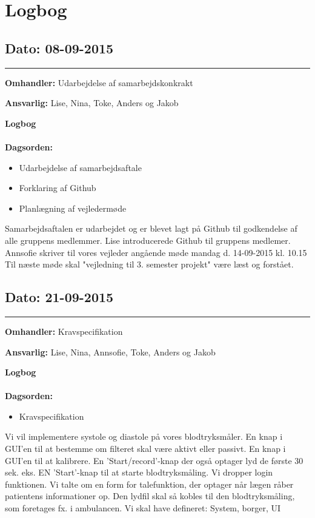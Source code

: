 \chapter{Logbog}

\section{Dato: 08-09-2015 }
\hrule

\textbf{Omhandler:} Udarbejdelse af samarbejdskonkrakt 

\textbf{Ansvarlig:} Lise, Nina, Toke, Anders og Jakob

\textbf{Logbog}
\\
\\
\textbf{Dagsorden:}
\begin{itemize}
	\item Udarbejdelse af samarbejdsaftale
	\item Forklaring af Github
	\item Planlægning af vejledermøde
\end{itemize}

Samarbejdsaftalen er udarbejdet og er blevet lagt på Github til godkendelse af alle gruppens medlemmer.\newline 
Lise introducerede Github til gruppens medlemer.\newline 
Annsofie skriver til vores vejleder angående møde mandag d. 14-09-2015 kl. 10.15\newline 
Til næste møde skal "vejledning til 3. semester projekt" være læst og forstået.\newline
	


\section{Dato: 21-09-2015 }
\hrule

\textbf{Omhandler:} Kravspecifikation

\textbf{Ansvarlig:} Lise, Nina, Annsofie, Toke, Anders og Jakob

\textbf{Logbog}
\\
\\
\textbf{Dagsorden:}
\begin{itemize}
	\item Kravspecifikation
\end{itemize}

Vi vil implementere systole og diastole på vores blodtryksmåler.
En knap i GUI'en til at bestemme om filteret skal være aktivt eller passivt.
En knap i GUI'en til at kalibrere.
En 'Start/record'-knap der også optager lyd de første 30 sek. eks.
EN 'Start'-knap til at starte blodtryksmåling.
Vi dropper login funktionen.
Vi talte om en form for talefunktion, der optager når lægen råber patientens informationer op. Den lydfil skal så kobles til den blodtryksmåling, som foretages fx. i ambulancen. 
Vi skal have defineret: System, borger, UI



